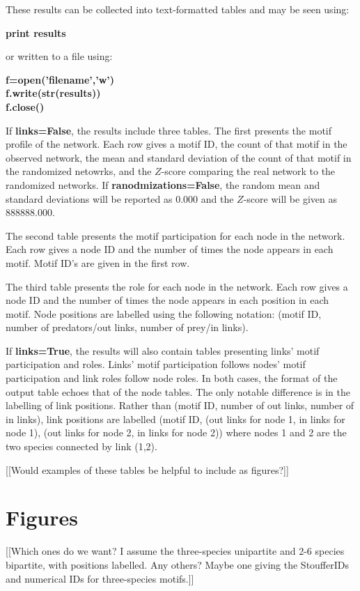 \documentclass[12pt]{article}
\begin{document}
			These results can be collected into text-formatted tables and may be seen using:

			\textbf{print results}

			or written to a file using:

			\textbf{f=open('filename','w')\\
					f.write(str(results))\\
					f.close()}\\
			\medskip


			If \textbf{links=False}, the results include three tables. The first presents the motif profile of the network. Each row gives a motif ID, the count of that motif in the observed network, the mean and standard deviation of the count of that motif in the randomized netowrks, and the $Z$-score comparing the real network to the randomized networks. If \textbf{ranodmizations=False}, the random mean and standard deviations will be reported as 0.000 and the $Z$-score will be given as 888888.000.



			The second table presents the motif participation for each node in the network. Each row gives a node ID and the number of times the node appears in each motif. Motif ID's are given in the first row.


			The third table presents the role for each node in the network. Each row gives a node ID and the number of times the node appears in each position in each motif. Node positions are labelled using the following notation: (motif ID, number of predators/out links, number of prey/in links).


			If \textbf{links=True}, the results will also contain tables presenting links' motif participation and roles. Links' motif participation follows nodes' motif participation and link roles follow node roles. In both cases, the format of the output table echoes that of the node tables. The only notable difference is in the labelling of link positions. Rather than (motif ID, number of out links, number of in links), link positions are labelled (motif ID, (out links for node 1, in links for node 1), (out links for node 2, in links for node 2)) where nodes 1 and 2 are the two species connected by link (1,2).


			[[Would examples of these tables be helpful to include as figures?]]


\section{Figures}


	[[Which ones do we want? I assume the three-species unipartite and 2-6 species bipartite, with positions labelled. Any others? Maybe one giving the StoufferIDs and numerical IDs for three-species motifs.]]
\end{document}
